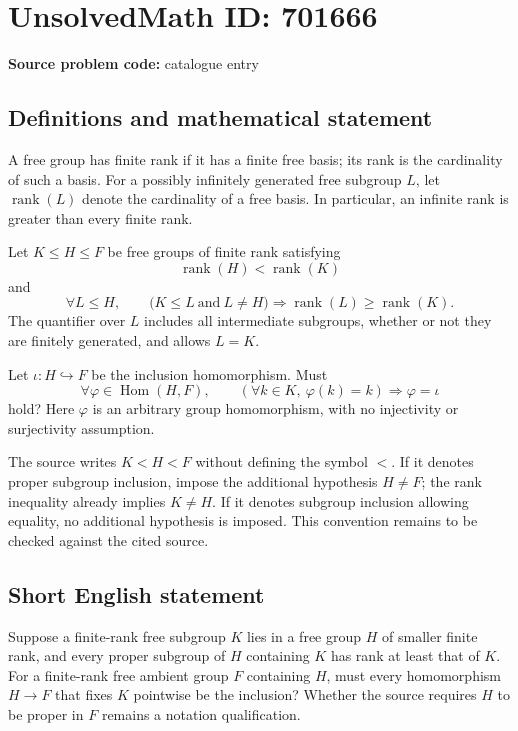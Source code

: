 \documentclass[11pt]{article}
\begin{document}
\section*{UnsolvedMath ID: 701666}
\textbf{Source problem code:} catalogue entry
\subsection{Definitions and mathematical statement}
A free group has finite rank if it has a finite free basis; its rank is the cardinality of such a basis. For a possibly infinitely generated free subgroup \(L\), let \(\operatorname{rank}(L)\) denote the cardinality of a free basis. In particular, an infinite rank is greater than every finite rank.

Let \(K\leq H\leq F\) be free groups of finite rank satisfying
\[
\operatorname{rank}(H)<\operatorname{rank}(K)
\]
and
\[
\forall L\leq H,\qquad
\bigl(K\leq L\ \text{and}\ L\ne H\bigr)
\Longrightarrow
\operatorname{rank}(L)\geq\operatorname{rank}(K).
\]
The quantifier over \(L\) includes all intermediate subgroups, whether or not they are finitely generated, and allows \(L=K\).

Let \(\iota:H\hookrightarrow F\) be the inclusion homomorphism. Must
\[
\forall\varphi\in\operatorname{Hom}(H,F),\qquad
\left(\forall k\in K,\ \varphi(k)=k\right)
\Longrightarrow \varphi=\iota
\]
hold? Here \(\varphi\) is an arbitrary group homomorphism, with no injectivity or surjectivity assumption.

The source writes \(K<H<F\) without defining the symbol \(<\). If it denotes proper subgroup inclusion, impose the additional hypothesis \(H\ne F\); the rank inequality already implies \(K\ne H\). If it denotes subgroup inclusion allowing equality, no additional hypothesis is imposed. This convention remains to be checked against the cited source.
\subsection{Short English statement}
Suppose a finite-rank free subgroup \(K\) lies in a free group \(H\) of smaller finite rank, and every proper subgroup of \(H\) containing \(K\) has rank at least that of \(K\). For a finite-rank free ambient group \(F\) containing \(H\), must every homomorphism \(H\to F\) that fixes \(K\) pointwise be the inclusion? Whether the source requires \(H\) to be proper in \(F\) remains a notation qualification.
\end{document}
